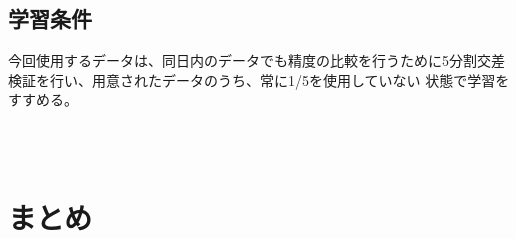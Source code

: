 	\subsection{学習条件}
		今回使用するデータは、同日内のデータでも精度の比較を行うために5分割交差検証を行い、用意されたデータのうち、常に1/5を使用していない
		状態で学習をすすめる。
	\subsection{}　

\section{}

\section{まとめ}

